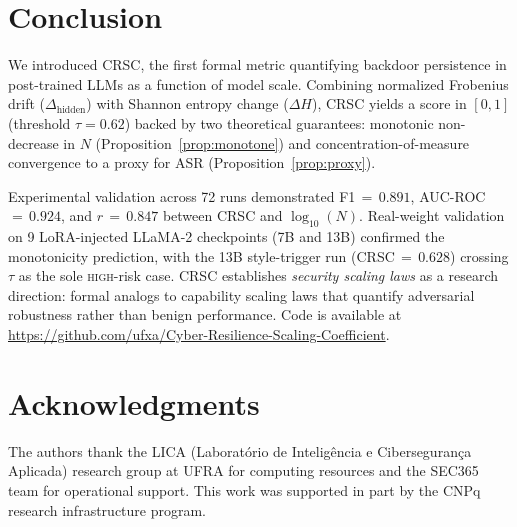 
\section{Conclusion}
\label{sec:conclusion}

We introduced CRSC, the first formal metric quantifying backdoor persistence in
post-trained LLMs as a function of model scale.
Combining normalized Frobenius drift ($\Delta_\text{hidden}$) with Shannon
entropy change ($\Delta H$), CRSC yields a score in $[0,1]$ (threshold
$\tau = 0.62$) backed by two theoretical guarantees: monotonic non-decrease in
$N$ (Proposition~\ref{prop:monotone}) and concentration-of-measure convergence
to a proxy for ASR (Proposition~\ref{prop:proxy}).

Experimental validation across 72 runs demonstrated F1\,$=\,0.891$, AUC-ROC\,$=\,0.924$,
and $r\,=\,0.847$ between CRSC and $\log_{10}(N)$.
Real-weight validation on 9 LoRA-injected LLaMA-2 checkpoints (7B and 13B)
confirmed the monotonicity prediction, with the 13B style-trigger run
(CRSC\,$=\,0.628$) crossing $\tau$ as the sole \textsc{high}-risk case.
CRSC establishes \emph{security scaling laws} as a research direction: formal
analogs to capability scaling laws that quantify adversarial robustness rather
than benign performance.
Code is available at \url{https://github.com/ufxa/Cyber-Resilience-Scaling-Coefficient}.

\section*{Acknowledgments}

The authors thank the LICA (Laboratório de Inteligência e Cibersegurança Aplicada)
research group at UFRA for computing resources and the SEC365 team for operational
support. This work was supported in part by the CNPq research infrastructure program.
